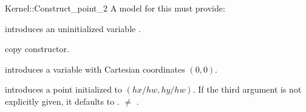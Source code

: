 \begin{ccRefFunctionObjectConcept}{Kernel::Construct_point_2}
A model for this must provide:



\ccHidden {}
             {introduces an uninitialized variable .}

\ccHidden {}
            {copy constructor.}

            {introduces a variable  with Cartesian coordinates
              $(0,0)$.}

\ccHidden{}
            {introduces a point  initialized to $(hx/hw,hy/hw)$.
             If the third argument is not explicitly given, it defaults
             to .
             \ccPrecond {} $\neq$ . }


\end{ccRefFunctionObjectConcept}
